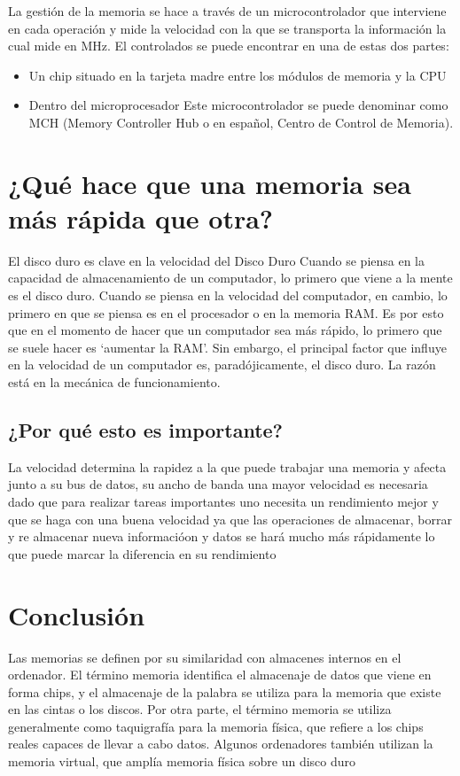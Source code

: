 \documentclass{article}
\begin{document}
La gestión de la memoria se hace a través de un microcontrolador que interviene en cada operación y mide la velocidad con la que se transporta la información la cual mide en MHz. El controlados se puede encontrar en una de estas dos partes:
\begin{itemize}
\item{ Un chip situado en la tarjeta madre entre los módulos de memoria y la CPU}
\end{itemize}

\begin{itemize}
\item{ Dentro del microprocesador Este microcontrolador se puede denominar como MCH (Memory Controller Hub o en español, Centro de Control de Memoria).}
\end{itemize}

\section{¿Qué hace que una memoria sea más rápida que otra?}
El disco duro es clave en la velocidad del Disco Duro Cuando se piensa en la capacidad de almacenamiento de un computador, lo primero que viene a la mente es el disco duro. Cuando se piensa en la velocidad del computador, en cambio, lo primero en que se piensa es en el procesador o en la memoria RAM. Es por esto que en el momento de hacer que un computador sea más rápido, lo primero que se suele hacer es ‘aumentar la RAM’. Sin em­bargo, el principal factor que influye en la velocidad de un computador es, paradójicamente, el disco duro. La razón está en la mecánica de funcionamiento.
\subsection{¿Por qué esto es importante?}
La velocidad determina la rapidez a la que puede trabajar una memoria y
afecta junto a su bus de datos, su ancho de banda una mayor velocidad es necesaria dado que para realizar tareas importantes uno necesita un rendimiento mejor y que se haga con una buena velocidad ya que las operaciones de almacenar, borrar y re almacenar nueva informacióon y datos se hará mucho más rápidamente lo que puede marcar la diferencia en su rendimiento



\section{Conclusión} \label{conclulsion}
Las memorias se definen por su similaridad con almacenes internos en el ordenador. El término memoria identifica el almacenaje de datos que viene en forma chips, y el almacenaje de la palabra se utiliza para la memoria que existe en las cintas o los discos. Por otra parte, el término memoria se utiliza generalmente como taquigrafía para la memoria física, que refiere a los chips reales capaces de llevar a cabo datos. Algunos ordenadores también utilizan la memoria virtual, que amplía memoria física sobre un disco duro
\end{document}
